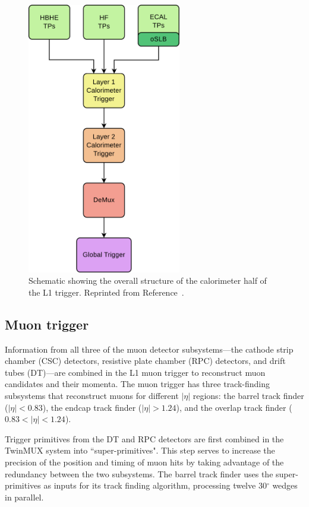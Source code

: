 \begin{figure}[h]
\begin{center}
\includegraphics[width=0.6\textwidth]{Figures/Trigger/caloL1T.pdf}
\end{center}
\caption{Schematic showing the overall structure of the calorimeter half of the L1 trigger. Reprinted from Reference~\cite{L1twiki}.}
\label{fig:caloL1T}
\end{figure}


\subsection{Muon trigger}
Information from all three of the muon detector subsystems---the cathode strip chamber (CSC) detectors, resistive plate chamber (RPC) detectors, and drift tubes (DT)---are combined in the L1 muon trigger to reconstruct muon candidates and their momenta. The muon trigger has three track-finding subsystems that reconstruct muons for different $|\eta|$ regions: the barrel track finder ($|\eta| < 0.83$), the endcap track finder ($|\eta| > 1.24$), and the overlap track finder ($0.83 < |\eta| < 1.24$).

Trigger primitives from the DT and RPC detectors are first combined in the TwinMUX system into ``super-primitives". This step serves to increase the precision of the position and timing of muon hits by taking advantage of the redundancy between the two subsystems.  The barrel track finder uses the super-primitives as inputs for its track finding algorithm, processing twelve 30$^{\circ}$ wedges in parallel. 

